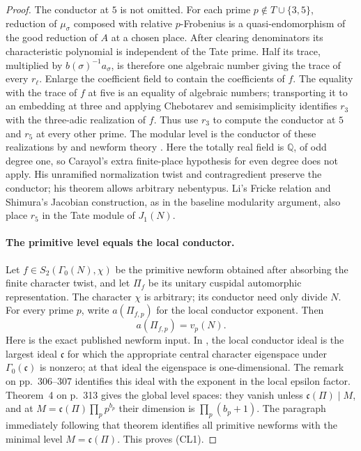 \documentclass[11pt]{article}
\theoremstyle{definition}
\theoremstyle{remark}
\begin{document}
\begin{proof}
The conductor at $5$ is not omitted. For each prime
$p\notin T\cup\{3,5\}$, reduction of $\mu_\sigma$ composed with
relative $p$-Frobenius is a quasi-endomorphism of the good reduction
of $A$ at a chosen place. After clearing denominators its characteristic
polynomial is independent of the Tate prime. Half its trace, multiplied
by $b(\sigma)^{-1}a_\sigma$, is therefore one algebraic number giving
the trace of every $r_\ell$. Enlarge the coefficient field to contain
the coefficients of $f$. The equality with the trace of $f$ at five
is an equality of algebraic numbers; transporting it to an embedding
at three and applying Chebotarev and semisimplicity identifies $r_3$
with the three-adic realization of $f$. Thus use $r_3$ to compute the
conductor at $5$ and $r_5$ at every other prime. The modular level is
the conductor of these realizations by
\cite[\S\S0.3--0.7, Theorem A, pp.~409--411]{carayol}
and newform theory \cite[Theorems 1 and 4]{casselman}.
Here the totally real field is $\mathbb Q$, of odd degree one, so
Carayol's extra finite-place hypothesis for even degree does not apply.
His unramified normalization twist and contragredient preserve the
conductor; his theorem allows arbitrary nebentypus.
Li's Fricke relation and Shimura's
Jacobian construction, as in the baseline modularity argument, also
place $r_5$ in the Tate module of $J_1(N)$.

\paragraph{The primitive level equals the local conductor.}
Let $f\in S_2(\Gamma_0(N),\chi)$ be the primitive newform obtained
after absorbing the finite character twist, and let $\Pi_f$ be its
unitary cuspidal automorphic representation. The character $\chi$
is arbitrary; its conductor need only divide $N$.
For every prime $p$, write $a(\Pi_{f,p})$ for the local conductor
exponent. Then
\[
 a(\Pi_{f,p})=v_p(N).
\tag{CL1}
\]
Here is the exact published newform input. In
\cite[Theorem~1, p.~302]{casselman}, the local conductor ideal is
the largest ideal $\mathfrak c$ for which the appropriate central
character eigenspace under $\Gamma_0(\mathfrak c)$ is nonzero;
at that ideal the eigenspace is one-dimensional. The remark on
pp.~306--307 identifies this ideal with the exponent in the local
epsilon factor. Theorem~4 on p.~313 gives the global level spaces:
they vanish unless $\mathfrak c(\Pi)\mid M$, and at
$M=\mathfrak c(\Pi)\prod_p p^{b_p}$ their dimension is
$\prod_p(b_p+1)$. The paragraph immediately following that theorem
identifies all primitive newforms with the minimal level
$M=\mathfrak c(\Pi)$. This proves (CL1).


\end{proof}
\end{document}
